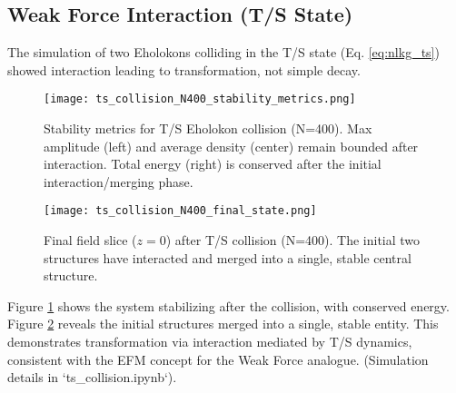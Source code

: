\documentclass[11pt]{article}
\begin{document}
\subsection{Weak Force Interaction (T/S State)}
The simulation of two Eholokons colliding in the T/S state (Eq. \ref{eq:nlkg_ts}) showed interaction leading to transformation, not simple decay.
\begin{figure}[htbp]
    \centering
    \texttt{[image: ts\_collision\_N400\_stability\_metrics.png]}
    \caption{Stability metrics for T/S Eholokon collision (N=400). Max amplitude (left) and average density (center) remain bounded after interaction. Total energy (right) is conserved after the initial interaction/merging phase.}
    \label{fig:ts_collision_metrics}
\end{figure}
\begin{figure}[htbp]
    \centering
    \texttt{[image: ts\_collision\_N400\_final\_state.png]}
    \caption{Final field slice (\(z=0\)) after T/S collision (N=400). The initial two structures have interacted and merged into a single, stable central structure.}
    \label{fig:ts_collision_final_state}
\end{figure}
Figure \ref{fig:ts_collision_metrics} shows the system stabilizing after the collision, with conserved energy. Figure \ref{fig:ts_collision_final_state} reveals the initial structures merged into a single, stable entity. This demonstrates transformation via interaction mediated by T/S dynamics, consistent with the EFM concept for the Weak Force analogue. (Simulation details in `ts_collision.ipynb`).
\end{document}
